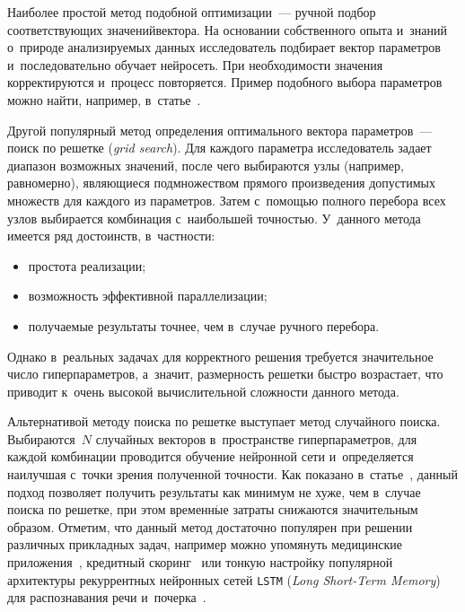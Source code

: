 \begin{multicols}{2}
Наиболее простой метод подобной оптимизации~--- ручной подбор соответствующих 
значений\linebreak вектора. На основании собственного 
опыта и~знаний о~природе анализируемых 
данных исследо\-ватель подбирает вектор параметров и~последовательно обучает нейросеть.
 При необходимости значения корректируются и~процесс повторяется. Пример
  подобного выбора параметров можно \mbox{найти}, например, в~статье~\cite{Gorshenin2019}.

Другой популярный метод определения оптимального вектора параметров~--- 
поиск по решетке
 (\textit{grid search}). Для каждого параметра исследователь 
задает диапазон возможных значений, после чего выбираются узлы (например, равномерно), 
являющиеся подмножеством прямого произведения допустимых множеств для каждого 
из параметров. Затем с~помощью полного перебора всех узлов выбирается 
комбинация с~наибольшей точностью. У~данного метода имеется ряд достоинств, в~частности:
\begin{itemize}
\item простота реализации;\\[-14.5pt]
\item возможность эффективной параллелизации;\\[-14.5pt]
\item получаемые результаты точнее, чем в~случае ручного перебора.
\end{itemize}

Однако в~реальных задачах для корректного реше\-ния требуется значительное 
число ги\-пер\-па\-ра\-мет\-ров, а~значит, размерность решетки быстро воз\-рас\-та\-ет, 
что приводит к~очень высокой вы\-чис\-ли\-тель\-ной сложности данного метода.

Альтернативой методу поиска по решетке выступает метод случайного поиска. 
Выбираются~$N$ случайных векторов в~пространстве ги\-пер\-па\-ра\-мет\-ров, для 
каждой комбинации проводится обучение нейронной сети и~определяется 
наилучшая с~точки зрения полученной точ\-ности. Как показано 
в~\mbox{статье}~\cite{Bergstra2012}, данный подход позволяет получить результаты 
как минимум не хуже, чем в~случае поиска по решетке, при этом временн$\acute{\mbox{ы}}$е затраты 
снижаются значительным образом. Отметим, что данный метод достаточно популярен 
при решении различных прикладных задач, например можно упомянуть медицинские 
приложения~\cite{Rojas-Dominguez2018,Uppu2018}, кредитный скоринг~\cite{Xia2017} 
или тонкую настройку популярной архитектуры рекуррентных нейронных
 сетей \verb"LSTM" (\textit{Long Short-Term Memory}) для распознавания
  речи и~почерка~\cite{Greff2017}.


\end{multicols}
